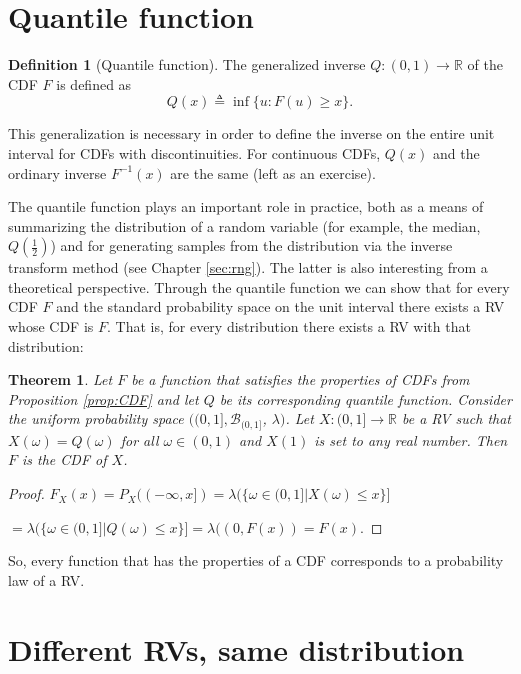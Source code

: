 \documentclass{book}
\theoremstyle{plain}%
\newtheorem{theorem}{Theorem}[section]
\theoremstyle{definition}
\newtheorem{definition}{Definition}[section]
\newlength{\arrow}
\begin{document}
\section{Quantile function}

\begin{definition}[Quantile function]
The generalized inverse $Q: (0, 1) \rightarrow \mathbb{R}$ of the CDF $F$ is defined as
$$Q(x) \triangleq \inf\{u: F(u) \geq x\}.$$\label{def:geninverse}
\end{definition}

This generalization is necessary in order to define the inverse on the entire unit interval for CDFs with discontinuities. For continuous CDFs, $Q(x)$ and the ordinary inverse $F^{-1}(x)$ are the same (left as an exercise).

The quantile function plays an important role in practice, both as a means of summarizing the distribution of a random variable (for example, the median, $Q(\frac{1}{2})$) and for generating samples from the distribution via the inverse transform method (see Chapter \ref{sec:rng}). The latter is also interesting from a theoretical perspective. Through the quantile function we can show that for every CDF $F$ and the standard probability space on the unit interval there exists a RV whose CDF is $F$. That is, for every distribution there exists a RV with that distribution:

\begin{theorem}
Let $F$ be a function that satisfies the properties of CDFs from Proposition \ref{prop:CDF} and let $Q$ be its corresponding quantile function. Consider the uniform probability space $((0,1], \mathcal{B}_{(0,1]}$, $\lambda)$. Let $X: (0,1] \rightarrow \mathbb{R}$ be a RV such that $X(\omega) = Q(\omega)$ for all $\omega \in (0, 1)$ and $X(1)$ is set to any real number. Then $F$ is the CDF of $X$.
\end{theorem}

\begin{proof}
$F_X(x) = P_X((-\infty, x]) = \lambda(\{\omega \in (0,1] | X(\omega) \leq x\}]$

$= \lambda(\{\omega \in (0,1] | Q(\omega) \leq x\}] = \lambda((0, F(x)) = F(x).$
\end{proof}
 
So, every function that has the properties of a CDF corresponds to a probability law of a RV.

\section{Different RVs, same distribution}
\end{document}
